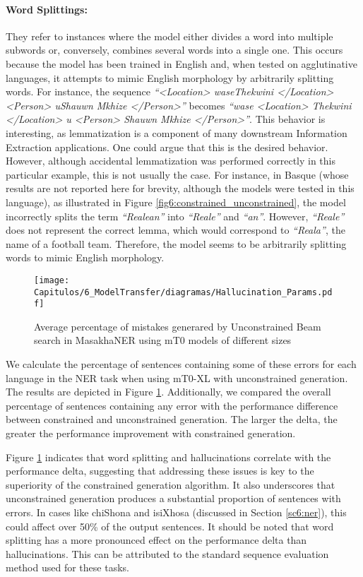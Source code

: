 \paragraph{Word Splittings:} They refer to instances where the model either divides a word into multiple subwords or, conversely, combines several words into a single one. This occurs because the model has been trained in English and, when tested on agglutinative languages, it attempts to mimic English morphology by arbitrarily splitting words. For instance, the sequence \textit{``<Location> waseThekwini </Location> <Person> uShauwn Mkhize </Person>''} becomes \textit{``wase <Location> Thekwini </Location> u <Person> Shauwn Mkhize </Person>''}. This behavior is interesting, as lemmatization is a component of many downstream Information Extraction applications. One could argue that this is the desired behavior. However, although accidental lemmatization was performed correctly in this particular example, this is not usually the case. For instance, in Basque (whose results are not reported here for brevity, although the models were tested in this language), as illustrated in Figure \ref{fig6:constrained_unconstrained}, the model incorrectly splits the term \textit{``Realean''} into \textit{``Reale''} and \textit{``an''}. However, \textit{``Reale''} does not represent the correct lemma, which would correspond to \textit{``Reala''}, the name of a football team. Therefore, the model seems to be arbitrarily splitting words to mimic English morphology.

\begin{figure}[tbp]
    \centering
    \texttt{[image: Capitulos/6\_ModelTransfer/diagramas/Hallucination\_Params.pdf]}
    \caption{Average percentage of mistakes generared by Unconstrained Beam search in MasakhaNER using mT0 models of different sizes}
    \label{fig6:HallucinationvsParams}
\end{figure}


We calculate the percentage of sentences containing some of these errors for each language in the NER task when using mT0-XL with unconstrained generation. The results are depicted in Figure \ref{fig6:HallucinationvsParams}. Additionally, we compared the overall percentage of sentences containing any error with the performance difference between constrained and unconstrained generation. The larger the delta, the greater the performance improvement with constrained generation.

Figure \ref{fig6:HallucinationvsParams} indicates that word splitting and hallucinations correlate with the performance delta, suggesting that addressing these issues is key to the superiority of the constrained generation algorithm. It also underscores that unconstrained generation produces a substantial proportion of sentences with errors. In cases like chiShona and isiXhosa (discussed in Section \ref{sc6:ner}), this could affect over 50\% of the output sentences. It should be noted that word splitting has a more pronounced effect on the performance delta than hallucinations. This can be attributed to the standard sequence evaluation method used for these tasks. 

